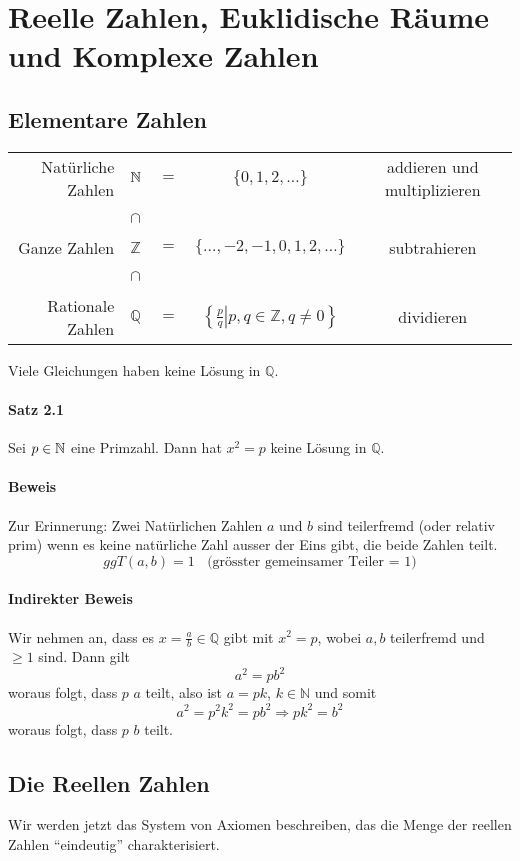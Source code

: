 \chapter{Reelle Zahlen, Euklidische Räume und Komplexe Zahlen}
\section{Elementare Zahlen}

\begin{tabular}{r l c c c}
Natürliche Zahlen & $\mathbb{N}$&$=$& $\{0,1,2,\dots\}$& addieren und multiplizieren\\
~& $\cap$ &~&~&~\\
Ganze Zahlen & $\mathbb{Z}$&$=$& $\{\dots ,-2,-1,0,1,2,\dots\}$& subtrahieren\\
~& $\cap$ &~&~&~\\
Rationale Zahlen & $\mathbb{Q}$&$=$& $\left\{ {\left. {\frac{p}{q}} \right|p,q \in \mathbb{Z},q\not  = 0} \right\}$& dividieren\\
\end{tabular}
Viele Gleichungen haben keine Lösung in $\mathbb{Q}$.
\subsubsection*{Satz 2.1}
Sei $p\in\mathbb{N}$ eine Primzahl. Dann hat $x^2=p$ keine Lösung in $\mathbb{Q}$.
\subsubsection*{Beweis}

Zur Erinnerung: Zwei Natürlichen Zahlen $a$ und $b$ sind teilerfremd (oder relativ prim) wenn es keine natürliche Zahl ausser der Eins gibt, die beide Zahlen teilt. \[ ggT(a,b)=1 \;\; \text{ (grösster gemeinsamer Teiler = 1)}\]

\subsubsection*{Indirekter Beweis}
Wir nehmen an, dass es $x=\frac{a}{b}\in \mathbb{Q}$ gibt mit $x^2 =p$, wobei $a,b$ teilerfremd und $\geq 1$ sind. Dann gilt \[a^2=pb^2\] woraus folgt, dass $p$ $a$ teilt, also ist $a=pk$, $k\in\mathbb{N}$ und somit \[a^2=p^2k^2=pb^2\Rightarrow pk^2=b^2\] woraus folgt, dass $p$ $b$ teilt.

\section{Die Reellen Zahlen}
Wir werden jetzt das System von Axiomen beschreiben, das die Menge der reellen Zahlen ``eindeutig'' charakterisiert. \\

